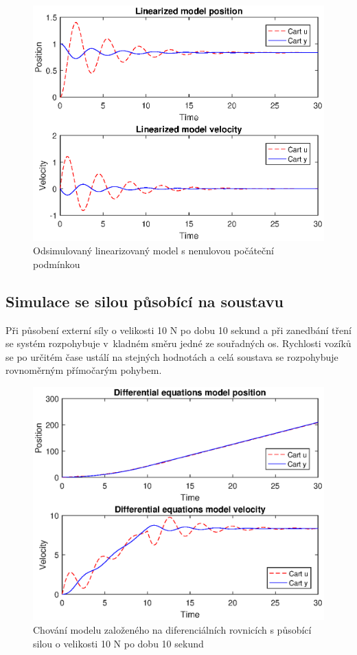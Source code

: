 \begin{figure}[htbp]
	\centering
	\includegraphics[scale=0.7]{graphs/linearized.eps}
	\caption{Odsimulovaný linearizovaný model s nenulovou počáteční podmínkou}
\end{figure}
\FloatBarrier

\subsection{Simulace se silou působící na soustavu}

Při působení externí síly o velikosti 10 N po dobu 10 sekund a při zanedbání tření se systém rozpohybuje v~kladném směru jedné ze souřadných os. Rychlosti vozíků se po určitém čase ustálí na stejných hodnotách a celá soustava se rozpohybuje rovnoměrným přímočarým pohybem. 

\begin{figure}[htbp]
	\centering
	\includegraphics[scale=0.7]{graphs/differential_f10.eps}
	\caption{Chování modelu založeného na diferenciálních rovnicích s působící silou o velikosti 10 N po dobu 10 sekund}
\end{figure}
\FloatBarrier


